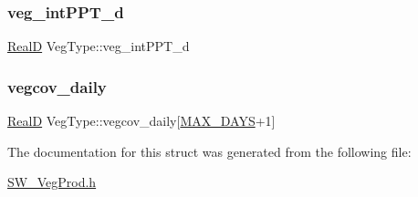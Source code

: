\mbox{\label{struct_veg_type_a39610c665011659163a7398b01b3aa89}} 
\subsubsection{\texorpdfstring{veg\+\_\+int\+P\+P\+T\+\_\+d}{veg\_intPPT\_d}}
{\footnotesize\ttfamily \hyperlink{generic_8h_af1c105fd5732f70b91ddaeda0cc340e3}{RealD} Veg\+Type\+::veg\+\_\+int\+P\+P\+T\+\_\+d}

\mbox{\label{struct_veg_type_abbd82dad2f5476416a3979b04c3b213e}} 
\subsubsection{\texorpdfstring{vegcov\+\_\+daily}{vegcov\_daily}}
{\footnotesize\ttfamily \hyperlink{generic_8h_af1c105fd5732f70b91ddaeda0cc340e3}{RealD} Veg\+Type\+::vegcov\+\_\+daily\mbox{[}\hyperlink{_times_8h_a01f08d46080872b9f4284873b7f9dee4}{M\+A\+X\+\_\+\+D\+A\+YS}+1\mbox{]}}



The documentation for this struct was generated from the following file\+:\begin{DoxyCompactItemize}
\item 
\hyperlink{_s_w___veg_prod_8h}{S\+W\+\_\+\+Veg\+Prod.\+h}\end{DoxyCompactItemize}
